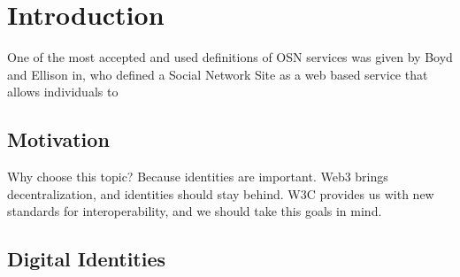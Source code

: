 \chapter{Introduction}
\label{cha:introduction}

 
One of the most accepted and used definitions of OSN services was given by Boyd and Ellison in, who defined a Social Network Site  as a web based service that allows individuals to

\section{Motivation}
Why choose this topic? Because identities are important.
Web3 brings decentralization, and identities should stay behind. W3C provides us with new standards for interoperability, and we should take this goals in mind. \cite{FakePaper11}

 
\section{Digital Identities}

 
 
 
 
